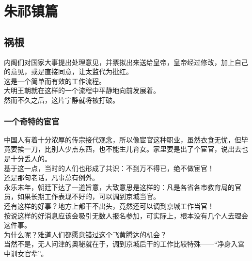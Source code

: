 \fi
\newpage
\chapter*{朱祁镇篇}
\section{祸根}
\ifnum{}
	\begin{multicols}{\theparacolNo}
\fi
内阁们对国家大事提出处理意见，并票拟出来送给皇帝，皇帝经过修改，加上自己的意见，或是直接同意，让太监代为批红。\\

这是一个简单而有效的工作流程。\\

大明王朝就在这样的一个流程中平静地向前发展着。\\

然而不久之后，这片宁静就将被打破。\\

\subsection{一个奇特的宦官}
中国人有着十分浓厚的传宗接代观念，所以像宦官这种职业，虽然衣食无忧，但毕竟要挨一刀，比别人少点东西，也不能生儿育女。家里要是出了个宦官，说出去也是十分丢人的。\\

基于这一点，当时的人们也形成了共识：不到万不得已，绝不做宦官！\\

还是那句老话，凡事总有例外。\\

永乐末年，朝廷下达了一道旨意，大致意思是这样的：凡是各省各市教育局的官员，如果长期工作表现不好的，可以调到京城当官。\\

还有这样的好事？地方上都干不出头，竟然还可以调到京城工作当官！\\

按说这样的好消息应该会吸引无数人报名参加，可实际上，根本没有几个人去理会这件事。\\

为什么呢？难道人们都愿意错过这个飞黄腾达的机会？\\

当然不是，无人问津的奥秘就在于，调到京城后干的工作比较特殊——“净身入宫中训女官辈”。\\


\end{multicols}
